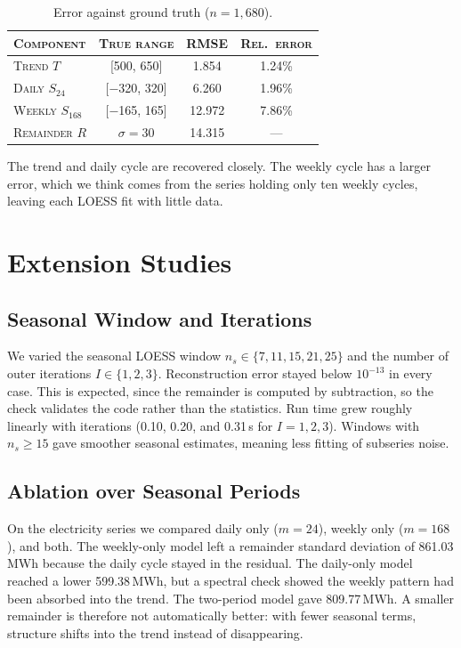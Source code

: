 \documentclass[10pt,twocolumn]{article}
\renewcommand\small{\fontsize{9}{10}\selectfont}
\begin{document}
\begin{table}[t]
\caption{Error against ground truth ($n=1{,}680$).}\label{tab:syn}
\centering\small
\begin{tabular}{@{}lccc@{}}
\toprule
\textsc{Component} & \textsc{True range} & \textsc{RMSE} & \textsc{Rel.\ error}\\
\midrule
\textsc{Trend} $T$ & [500, 650] & 1.854 & 1.24\%\\
\textsc{Daily} $S_{24}$ & [$-$320, 320] & 6.260 & 1.96\%\\
\textsc{Weekly} $S_{168}$ & [$-$165, 165] & 12.972 & 7.86\%\\
\textsc{Remainder} $R$ & $\sigma=30$ & 14.315 & ---\\
\bottomrule
\end{tabular}
\end{table}

The trend and daily cycle are recovered closely. The weekly cycle has a larger error, which we think comes from the series holding only ten weekly cycles, leaving each LOESS fit with little data.

\section{Extension Studies}
\subsection{Seasonal Window and Iterations}
We varied the seasonal LOESS window $n_s\in\{7,11,15,21,25\}$ and the number of outer iterations $I\in\{1,2,3\}$. Reconstruction error stayed below $10^{-13}$ in every case. This is expected, since the remainder is computed by subtraction, so the check validates the code rather than the statistics. Run time grew roughly linearly with iterations (0.10, 0.20, and 0.31\,s for $I=1,2,3$). Windows with $n_s\ge15$ gave smoother seasonal estimates, meaning less fitting of subseries noise.

\subsection{Ablation over Seasonal Periods}
On the electricity series we compared daily only ($m=24$), weekly only ($m=168$), and both. The weekly-only model left a remainder standard deviation of 861.03\,MWh because the daily cycle stayed in the residual. The daily-only model reached a lower 599.38\,MWh, but a spectral check showed the weekly pattern had been absorbed into the trend. The two-period model gave 809.77\,MWh. A smaller remainder is therefore not automatically better: with fewer seasonal terms, structure shifts into the trend instead of disappearing.
\end{document}

